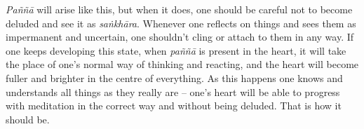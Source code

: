 \emph{Paññā} will arise like this, but
when it does, one should be careful not to become deluded and see it as
\emph{saṅkhāra}. Whenever one reflects on things and sees them as
impermanent and uncertain, one shouldn't cling or attach to them in any
way. If one keeps developing this state, when \emph{paññā} is present in
the heart, it will take the place of one's normal way of thinking and
reacting, and the heart will become fuller and brighter in the centre of
everything. As this happens one knows and understands all things as they
really are -- one's heart will be able to progress with meditation in
the correct way and without being deluded. That is how it should be. 

